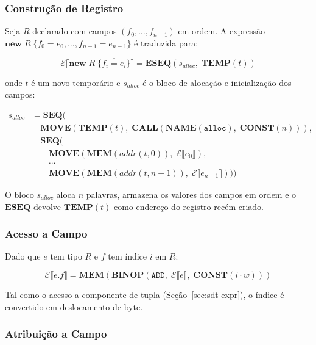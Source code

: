 \subsubsection*{Construção de Registro}

Seja \(R\) declarado com campos \((f_0,\ldots,f_{n-1})\) em ordem. A
expressão \(\mathbf{new}\; R\;\{f_0\!=\!e_0,\ldots,f_{n-1}\!=\!e_{n-1}\}\)
é traduzida para:

\[
  \mathcal{E}\llbracket \mathbf{new}\; R\;\{\overline{f_i\!=\!e_i}\} \rrbracket
  = \mathbf{ESEQ}(s_{\mathit{alloc}},\; \mathbf{TEMP}(t))
\]

onde \(t\) é um novo temporário e \(s_{\mathit{alloc}}\) é o bloco de
alocação e inicialização dos campos:

\[
  \begin{aligned}
    s_{\mathit{alloc}}
    &= \mathbf{SEQ}( \\
      &\quad \mathbf{MOVE}(\mathbf{TEMP}(t),\;
      \mathbf{CALL}(\mathbf{NAME}(\texttt{alloc}),\; \mathbf{CONST}(n))), \\
      &\quad \mathbf{SEQ}( \\
        &\qquad \mathbf{MOVE}(\mathbf{MEM}(\mathit{addr}(t,0)),\;
        \mathcal{E}\llbracket e_0 \rrbracket), \\
        &\qquad \cdots \\
        &\qquad \mathbf{MOVE}(\mathbf{MEM}(\mathit{addr}(t,n-1)),\;
    \mathcal{E}\llbracket e_{n-1} \rrbracket)))
  \end{aligned}
\]

O bloco \(s_{\mathit{alloc}}\) aloca
\(n\) palavras, armazena os valores dos campos em ordem e o
\(\mathbf{ESEQ}\) devolve \(\mathbf{TEMP}(t)\) como endereço do registro
recém-criado.

\subsubsection*{Acesso a Campo}

Dado que \(e\) tem tipo \(R\) e \(f\) tem índice \(i\) em \(R\):

\[
  \mathcal{E}\llbracket e.f \rrbracket =
  \mathbf{MEM}\!\left(
    \mathbf{BINOP}(\mathtt{ADD},\;
      \mathcal{E}\llbracket e \rrbracket,\;
    \mathbf{CONST}(i \cdot w))
  \right)
\]

Tal como o acesso a componente de tupla (Seção~\ref{sec:sdt-expr}), o
índice é convertido em deslocamento de byte.

\subsubsection*{Atribuição a Campo}

